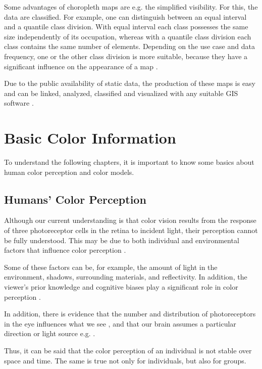 Some advantages of choropleth maps are e.g. the simplified visibility. For this, the data are classified. For example, one can distinguish between an equal interval and a quantile class division. With equal interval each class possesses the same size independently of its occupation, whereas with a quantile class division each class contains the same number of elements. Depending on the use case and data frequency, one or the other class division is more suitable, because they have a significant influence on the appearance of a map \parencite{schiewe2015, rahlf2020}.

Due to the public availability of static data, the production of these maps is easy and can be linked, analyzed, classified and visualized with any suitable GIS software \parencite{hruby2016}.

\section{Basic Color Information}

To understand the following chapters, it is important to know some basics about human color perception and color models.

\subsection{Humans' Color Perception}
Although our current understanding is that color vision results from the response of three photoreceptor cells in the retina to incident light, their perception cannot be fully understood. This may be due to both individual and environmental factors that influence color perception \parencite{lafer2015, xiao2016}.

Some of these factors can be, for example, the amount of light in the environment, shadows, surrounding materials, and reflectivity. In addition, the viewer's prior knowledge and cognitive biases play a significant role in color perception \parencite{derefeldt2004, foster2011}.

In addition, there is evidence that the number and distribution of photoreceptors in the eye influences what we see \textcite{roy1991}, and that our brain assumes a particular direction or light source e.g. \textcite{gegenfurtner2015, lafer2015}.

Thus, it can be said that the color perception of an individual is not stable over space and time. The same is true not only for individuals, but also for groups. 

